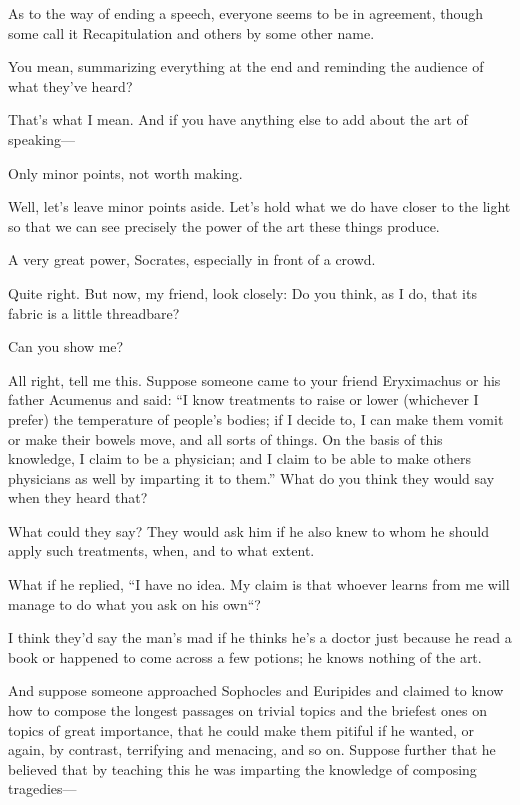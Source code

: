 As to the way of ending a speech, everyone seems to be in agreement,
though some call it Recapitulation and others by some other name.

\sayphaedrus You mean, summarizing everything at the end and reminding the
audience of what they've heard?

\saysocrates That's what I mean. And if you have anything else to add about
the art of speaking---

\sayphaedrus Only minor points, not worth making.

\saysocrates Well, let's leave minor points aside. Let's
hold what we do have closer to the light so that we can see precisely
the power of the art these things produce.

\sayphaedrus A very great power, Socrates, especially in front of a crowd.

\saysocrates Quite right. But now, my friend, look closely: Do you think,
as I do, that its fabric is a little threadbare?

\sayphaedrus Can you show me?

\saysocrates All right, tell me this. Suppose someone came to your friend
Eryximachus or his father Acumenus and said: “I know treatments to raise
or lower (whichever I prefer) the temperature of people's bodies; if I
decide to, I can make them vomit or make their bowels move, and
all sorts of things. On the basis of this knowledge, I claim to be a
physician; and I claim to be able to make others physicians as well by
imparting it to them.” What do you think they would say when they heard
that?

\sayphaedrus What could they say? They would ask him if he also knew to
whom he should apply such treatments, when, and to what extent.

\saysocrates What if he replied, “I have no idea. My claim is that whoever
learns from me will manage to do what you ask on his own“?

\sayphaedrus I think they'd say the man's mad if he thinks he's a doctor
just because he read a book or happened to come across a few potions; he
knows nothing of the art.

\saysocrates And suppose someone approached Sophocles and Euripides and
claimed to know how to compose the longest passages on trivial topics
and the briefest ones on topics of great importance, that he could make
them pitiful if he wanted, or again, by contrast, terrifying and
menacing, and so on. Suppose further that he believed that by
teaching this he was imparting the knowledge of composing tragedies---

